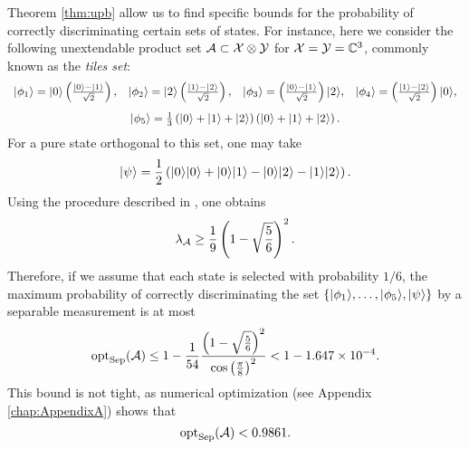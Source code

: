 \begin{example}
\label{ex:tiles-set}

Theorem \ref{thm:upb} allow us to find specific bounds for the probability 
of correctly discriminating certain sets of states.
For instance, here we consider the following unextendable product set  
$\mathcal{A} \subset \mathcal{X}\otimes\mathcal{Y}$ for $\mathcal{X} = \mathcal{Y} = \mathbb{C}^3$, commonly known as the 
\emph{tiles set}:
\begin{equation}
  \begin{array}{llll}
    \ket{\phi_1} = \ket{0}\left(\frac{\ket{0}-\ket{1}}{\sqrt{2}}\right),
    &\ket{\phi_2} = \ket{2}\left(\frac{\ket{1}-\ket{2}}{\sqrt{2}}\right),
    &\ket{\phi_3} = \left(\frac{\ket{0}-\ket{1}}{\sqrt{2}}\right)\ket{2},
    &\ket{\phi_4} = \left(\frac{\ket{1}-\ket{2}}{\sqrt{2}}\right)\ket{0},\\[4mm]
    \multicolumn{4}{c}{\ket{\phi_5} = 
      \frac{1}{3}\left(\ket{0}+\ket{1}+\ket{2}\right)
      \left(\ket{0}+\ket{1}+\ket{2}\right).}
  \end{array}
\end{equation}
For a pure state orthogonal to this set, one may take
\begin{equation}
  \lvert\mspace{0.5mu} \psi \mspace{0.5mu} \rangle = \frac{1}{2}\left(\lvert\mspace{0.5mu} 0 \mspace{0.5mu} \rangle\lvert\mspace{0.5mu} 0 \mspace{0.5mu} \rangle + \lvert\mspace{0.5mu} 0 \mspace{0.5mu} \rangle\lvert\mspace{0.5mu} 1 \mspace{0.5mu} \rangle -
  \lvert\mspace{0.5mu} 0 \mspace{0.5mu} \rangle\lvert\mspace{0.5mu} 2 \mspace{0.5mu} \rangle -  \lvert\mspace{0.5mu} 1 \mspace{0.5mu} \rangle\lvert\mspace{0.5mu} 2 \mspace{0.5mu} \rangle\right).
\end{equation}
Using the procedure described in \cite{Terhal01}, one obtains
\begin{equation}
  \lambda_{\mathcal{A}} \geq \frac{1}{9}\left( 1 - \sqrt{\frac{5}{6}} \right)^{2}.
\end{equation}
Therefore, if we assume that each state is selected with probability $1/6$, 
the maximum probability of correctly discriminating the set 
$\left\{ \lvert\mspace{0.5mu} \phi_1 \mspace{0.5mu} \rangle, \ldots, \lvert\mspace{0.5mu} \phi_5 \mspace{0.5mu} \rangle, \lvert\mspace{0.5mu} \psi \mspace{0.5mu} \rangle \right\}$ by a
separable measurement is at most
\begin{equation}
  \operatorname{opt}_{\mathrm{Sep}}(\mathcal{A}) \leq 1 - \frac{1}{54}\frac{\left( 1 - \sqrt{\frac{5}{6}} \right)^{2}}
  {\cos\left(\frac{\pi}{8}\right)^{2}} <  1 - 1.647 \times 10^{-4}.
\end{equation}
This bound is not tight, as numerical optimization (see Appendix \ref{chap:AppendixA})
shows that
\begin{equation}
  \operatorname{opt}_{\mathrm{Sep}}(\mathcal{A}) < 0.9861 .
\end{equation} 

\end{example}

